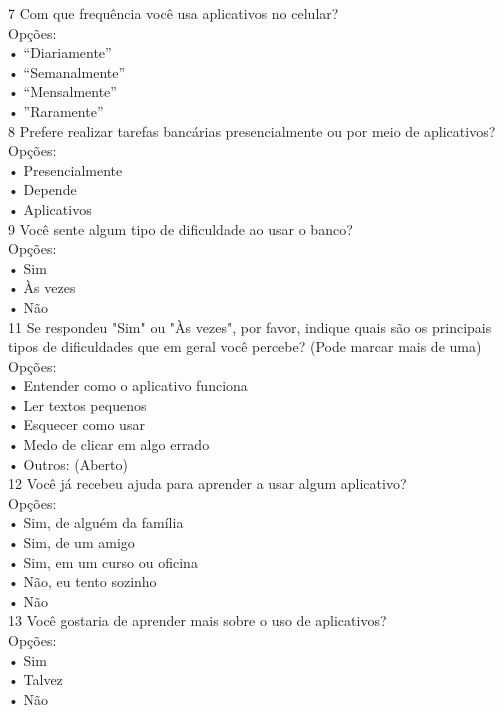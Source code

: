 7 Com que frequência você usa aplicativos no celular?\\
Opções:\\
• “Diariamente”\\
• “Semanalmente”\\
• “Mensalmente”\\
• ”Raramente”\\

8 Prefere realizar tarefas bancárias presencialmente ou por meio de aplicativos?\\
Opções:\\
• Presencialmente\\
• Depende\\
• Aplicativos\\

9 Você sente algum tipo de dificuldade ao usar o banco?\\
Opções:\\
• Sim\\
• Às vezes\\
• Não\\

11 Se respondeu "Sim" ou "Às vezes", por favor, indique quais são os
principais tipos de dificuldades que em geral você percebe? (Pode marcar mais de uma)\\
Opções:\\
• Entender como o aplicativo funciona\\
• Ler textos pequenos\\
• Esquecer como usar\\
• Medo de clicar em algo errado\\
• Outros: (Aberto)\\

12 Você já recebeu ajuda para aprender a usar algum aplicativo?\\
Opções:\\
• Sim, de alguém da família\\
• Sim, de um amigo\\
• Sim, em um curso ou oficina\\
• Não, eu tento sozinho\\
• Não\\

13 Você gostaria de aprender mais sobre o uso de aplicativos?\\
Opções:\\
• Sim\\
• Talvez\\
• Não\\

